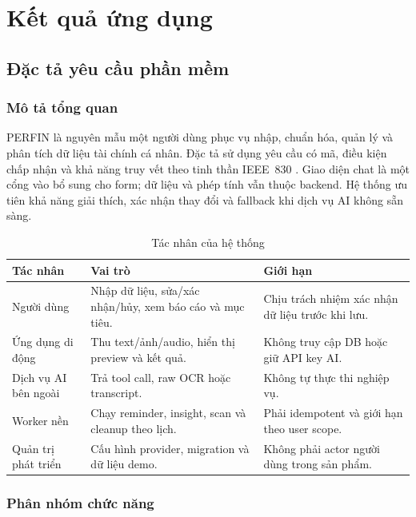 \chapter{Kết quả ứng dụng}
\label{chap:results}

\section{Đặc tả yêu cầu phần mềm}

\subsection{Mô tả tổng quan}

PERFIN là nguyên mẫu một người dùng phục vụ nhập, chuẩn hóa, quản lý và phân tích dữ liệu tài chính cá nhân. Đặc tả sử dụng yêu cầu có mã, điều kiện chấp nhận và khả năng truy vết theo tinh thần IEEE~830 \cite{ieee830}. Giao diện chat là một cổng vào bổ sung cho form; dữ liệu và phép tính vẫn thuộc backend. Hệ thống ưu tiên khả năng giải thích, xác nhận thay đổi và fallback khi dịch vụ AI không sẵn sàng.

\begin{table}[H]
  \centering
  \caption{Tác nhân của hệ thống}
  \label{tab:actors}
  \begin{tabularx}{\textwidth}{@{}L{3.5cm}Y Y@{}}
    \toprule
    \textbf{Tác nhân} & \textbf{Vai trò} & \textbf{Giới hạn} \\
    \midrule
    Người dùng & Nhập dữ liệu, sửa/xác nhận/hủy, xem báo cáo và mục tiêu. & Chịu trách nhiệm xác nhận dữ liệu trước khi lưu. \\
    Ứng dụng di động & Thu text/ảnh/audio, hiển thị preview và kết quả. & Không truy cập DB hoặc giữ API key AI. \\
    Dịch vụ AI bên ngoài & Trả tool call, raw OCR hoặc transcript. & Không tự thực thi nghiệp vụ. \\
    Worker nền & Chạy reminder, insight, scan và cleanup theo lịch. & Phải idempotent và giới hạn theo user scope. \\
    Quản trị phát triển & Cấu hình provider, migration và dữ liệu demo. & Không phải actor người dùng trong sản phẩm. \\
    \bottomrule
  \end{tabularx}
\end{table}

\subsection{Phân nhóm chức năng}

